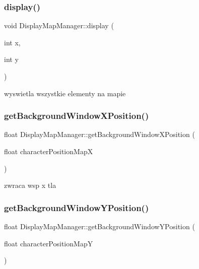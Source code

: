 \subsubsection{\texorpdfstring{display()}{display()}}
{\footnotesize\ttfamily void Display\+Map\+Manager\+::display (\begin{DoxyParamCaption}\item[{int}]{x,  }\item[{int}]{y }\end{DoxyParamCaption})}

wyswietla wszystkie elementy na mapie \mbox{\label{class_display_map_manager_a12847fea83dc76f47255605f7de3d020}} 
\subsubsection{\texorpdfstring{get\+Background\+Window\+X\+Position()}{getBackgroundWindowXPosition()}}
{\footnotesize\ttfamily float Display\+Map\+Manager\+::get\+Background\+Window\+X\+Position (\begin{DoxyParamCaption}\item[{float}]{character\+Position\+MapX }\end{DoxyParamCaption})\hspace{0.3cm}{\ttfamily [protected]}}

zwraca wsp x tla \mbox{\label{class_display_map_manager_a7326948a0f1ef16c89a27f5bde09192b}} 
\subsubsection{\texorpdfstring{get\+Background\+Window\+Y\+Position()}{getBackgroundWindowYPosition()}}
{\footnotesize\ttfamily float Display\+Map\+Manager\+::get\+Background\+Window\+Y\+Position (\begin{DoxyParamCaption}\item[{float}]{character\+Position\+MapY }\end{DoxyParamCaption})\hspace{0.3cm}{\ttfamily [protected]}}

